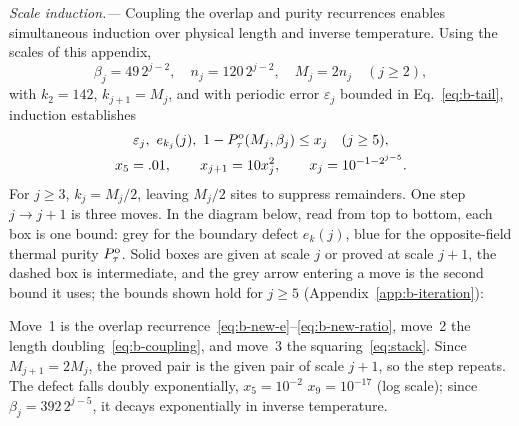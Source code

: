 \documentclass[aps,prl,reprint,amsmath,amssymb,nofootinbib,raggedbottom]{revtex4-2}
\begin{document}
\emph{Scale induction.---}
Coupling the overlap and purity recurrences enables simultaneous induction over physical length and inverse temperature.
Using the scales of this appendix,
\begin{equation}
 \beta_j=49\,2^{j-2},\quad n_j=120\,2^{j-2},\quad
 M_j=2n_j\quad(j\ge2),
 \label{eq:b-scales}
\end{equation}
with $k_2=142$, $k_{j+1}=M_j$, and with periodic error $\varepsilon_j$ bounded in Eq.~\eqref{eq:b-tail}, induction establishes
\begin{equation}
 \begin{gathered}
 \varepsilon_j,\ e_{k_j}(j),\ 1-P_{\tau}^{\mathrm{o}}(M_j,\beta_j)\le x_j\quad(j\ge5),\\
 x_5=.01,\qquad x_{j+1}=10x_j^2,\qquad
 x_j=10^{-1-2^{j-5}}.
 \end{gathered}
 \label{eq:b-x}
\end{equation}
For $j\ge3$, $k_j=M_j/2$, leaving $M_j/2$ sites to suppress remainders.
One step $j\to j+1$ is three moves. In the diagram below, read from top to
bottom, each box is one bound: grey for the boundary defect $e_k(j)$, blue
for the opposite-field thermal purity $P_{\tau}^{\mathrm{o}}$. Solid boxes are given at
scale $j$ or proved at scale $j+1$, the dashed box is intermediate, and the
grey arrow entering a move is the second bound it uses; the bounds shown hold
for $j\ge5$ (Appendix~\ref{app:b-iteration}):
\begin{proofdiagram}
\begin{prooflanes}
  
  
  
  
\end{prooflanes}
\end{proofdiagram}
Move~1 is the overlap recurrence~\eqref{eq:b-new-e}--\eqref{eq:b-new-ratio},
move~2 the length doubling~\eqref{eq:b-coupling},
and move~3 the squaring~\eqref{eq:stack}. Since $M_{j+1}=2M_j$, the proved
pair is the given pair of scale $j+1$, so the step repeats. The defect falls doubly exponentially,
$x_5=10^{-2}$\,\,$x_9=10^{-17}$ (log scale); since
$\beta_j=392\,2^{j-5}$, it decays exponentially in inverse temperature.
\end{document}
